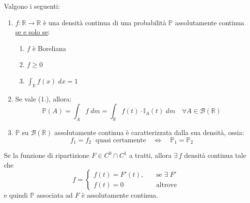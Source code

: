 \begin{teorema}
Valgono i seguenti:
\begin{enumerate}
    \item $f:\mathbb{R}\to\mathbb{R}$ è una densità continua di una probabilità $\mathbb{P}$ assolutamente continua \underline{se e solo se}:
    \begin{enumerate}
        \item $f$ è Boreliana
        \item $f\geq0$
        \item $\int_\mathbb{R}f(x)\;dx = 1$
    \end{enumerate}
    \item Se vale (1.), allora:
    \[\mathbb{P}(A) = \int_Af\;dm = \int_\mathbb{R} f(t)\cdot \mathbb{I}_A(t)\;dm\quad \forall A\in \mathcal{B}(\mathbb{R})\]
    \item $\mathbb{P}$ su $\mathcal{B}(\mathbb{R})$ assolutamente continua è caratterizzata dalla sua densità, ossia:
    \[f_1=f_2\;\text{ quasi certamente}\quad \iff \quad \mathbb{P}_1 = \mathbb{P}_2\]
\end{enumerate}
\end{teorema}

\begin{proposizione}
    Se la funzione di ripartizione $F\in C^0\cap C^1$ a tratti, allora $\exists\,f$ densità continua tale che
    \[f = \begin{cases}
        f(t) = F'(t), \quad & \text{se } \exists \;F'\\
        f(t) = 0 & \text{altrove}
    \end{cases}\]
    e quindi $\mathbb{P}$ associata ad $F$ è assolutamente continua.
\end{proposizione}

